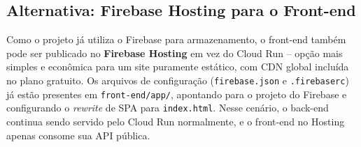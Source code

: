 \documentclass[
	12pt,
	openright,
	oneside,
	a4paper,
	english,
	brazil
	]{abntex2}
\begin{document}
\begin{apendicesenv}
\begin{table}[H]
\centering
\caption{Principais variáveis de ambiente do FeelFrame}
\label{tab:deploy-env}
\end{table}

\section{Alternativa: Firebase Hosting para o Front-end}
\label{sec:deploy-firebase-hosting}

Como o projeto já utiliza o Firebase para armazenamento, o front-end também pode ser publicado no \textbf{Firebase Hosting} em vez do Cloud Run -- opção mais simples e econômica para um site puramente estático, com CDN global incluída no plano gratuito. Os arquivos de configuração (\texttt{firebase.json} e \texttt{.firebaserc}) já estão presentes em \texttt{front-end/app/}, apontando para o projeto do Firebase e configurando o \textit{rewrite} de SPA para \texttt{index.html}. Nesse cenário, o back-end continua sendo servido pelo Cloud Run normalmente, e o front-end no Hosting apenas consome sua API pública.


\end{apendicesenv}
\end{document}

